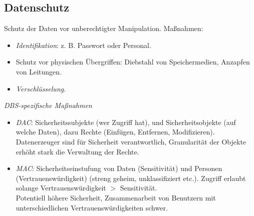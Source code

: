 \documentclass[a4paper,parskip=half*,DIV=15,fontsize=11pt]{scrartcl}
\begin{document}
\begin{minipage}[t]{0.45\textwidth}
\subsection{Datenschutz}
Schutz der Daten vor unberechtigter Manipulation. Maßnahmen:
\begin{itemize}
\item \emph{Identifikation}: z. B. Passwort oder Personal.
\item Schutz vor physischen Übergriffen: Diebstahl von Speichermedien, Anzapfen von Leitungen.
\item \emph{Verschlüsselung}.
\end{itemize}
\emph{DBS-spezifische Maßnahmen}
\begin{itemize}
\item \emph{DAC}: Sicherheitssubjekte (wer Zugriff hat), und Sicherheitsobjekte (auf welche Daten), dazu Rechte (Einfügen, Entfernen, Modifizieren). \\
Datenerzeuger sind für Sicherheit verantwortlich, Granularität der Objekte erhöht stark die Verwaltung der Rechte.
\item \emph{MAC}: Sicherheitseinstufung von Daten (Sensitivität) und Personen (Vertrauenswürdigkeit) (streng geheim, unklassifiziert etc.). Zugriff erlaubt solange Vertrauenswürdigkeit $>$ Sensitivität. \\
Potentiell höhere Sicherheit, Zusammenarbeit von Benutzern mit unterschiedlichen Vertrauenswürdigkeiten schwer.
\end{itemize}
\end{minipage}
\end{document}
